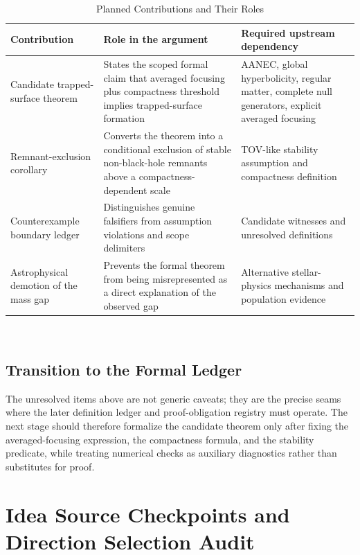 \documentclass[conference]{IEEEtran}
\begin{document}
\begin{table}[htbp]
\centering
\footnotesize
\setlength{\tabcolsep}{3pt}
\renewcommand{\arraystretch}{1.12}
\caption{Planned Contributions and Their Roles}
\label{tab:research-questions-and-contributions-rq-contributions}
\begin{tabular}{|p{}|p{}|p{}|}
\hline
Contribution & Role in the argument & Required upstream dependency \\\hline
Candidate trapped-surface theorem & States the scoped formal claim that averaged focusing plus compactness threshold implies trapped-surface formation & AANEC, global hyperbolicity, regular matter, complete null generators, explicit averaged focusing \\\hline
Remnant-exclusion corollary & Converts the theorem into a conditional exclusion of stable non-black-hole remnants above a compactness-dependent scale & TOV-like stability assumption and compactness definition \\\hline
Counterexample boundary ledger & Distinguishes genuine falsifiers from assumption violations and scope delimiters & Candidate witnesses and unresolved definitions \\\hline
Astrophysical demotion of the mass gap & Prevents the formal theorem from being misrepresented as a direct explanation of the observed gap & Alternative stellar-physics mechanisms and population evidence \\\hline
\end{tabular}
\end{table}~\cite{cite_07d6df5d6978a1fc,cite_0ed84243cf171bc4,cite_42e341ff6471ce89,cite_789b47fb0241d9ae,cite_7a407c865faafd11,cite_7a44e6730c44cb39,cite_977568cf7b8a55bf,cite_cbbced417410bc6c,cite_f634820e22d7a238,cite_fd0f77b2a173c0ab}

\subsection{Transition to the Formal Ledger}
The unresolved items above are not generic caveats; they are the precise seams where the later definition ledger and proof-obligation registry must operate. The next stage should therefore formalize the candidate theorem only after fixing the averaged-focusing expression, the compactness formula, and the stability predicate, while treating numerical checks as auxiliary diagnostics rather than substitutes for proof.

\section{Idea Source Checkpoints and Direction Selection Audit}
\end{document}
